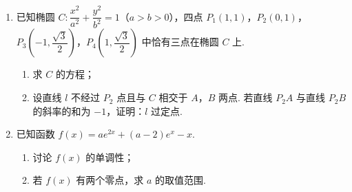 \begin{description}
\begin{enumerate}[leftmargin=5pt]
\begin{enumerate}
\begin{enumerate}
{\renewcommand{\arraystretch}{0.8}
\begin{center}
\begin{tabular}{cccccccc}
\(9.95\) & \(10.12\) & \(9.96\) & \(9.96\) & \(10.01\) & \(9.92\) & \(9.98\) & \(10.04\) \\
\(10.26\) & \(9.91\) & \(10.13\) & \(10.02\) & \(9.22\) & \(10.04\) & \(10.05\) & \(9.95\)
\end{tabular}
\end{center}}

经计算得 \(\bar x=\dfrac1{16}\sum_{i=1}^{16}x_i=9.97\)，
\(s=\sqrt{\dfrac1{16}\sum_{i=1}^{16}(x_i-\bar x)^2}
=\sqrt{\dfrac1{16}\left(\sum_{i=1}^{16}x_i^2-16\bar x^2\right)}\approx0.212\)，
其中 \(x_i\) 为抽取的第 \(i\) 个零件的尺寸，\(i=1\)，\(2\)，\(\dots\)，\(16\).

用样本平均数作为 \(\mu\) 的估计值，用样本标准差 \(s\) 作为 \(\sigma\) 的估计值，利用估计值判断是否需对当天的生产过程进行检查？剔除 \((\hat\mu-3\hat\sigma,\hat\mu+3\hat\sigma)\) 之外的数据，用剩下的数据估计 \(\mu\) 和 \(\sigma\)（精确到 \(0.01\)）.
\end{enumerate}
\end{enumerate}

附：若随机变量 \(Z\) 服从正态分布 \(N(\mu,\sigma^2)\)，则 \(P(\mu-3\sigma<Z<\mu+3\sigma)=0.9974\)，\(0.9974^{16}\approx0.9592\)，\(\sqrt{0.008}\approx0.09\).

        \item 已知椭圆 \(C:\dfrac{x^2}{a^2}+\dfrac{y^2}{b^2}=1\)（\(a>b>0\)），四点 \(P_1(1,1)\)，\(P_2(0,1)\)，\(P_3\left(-1,\dfrac{\sqrt3}{2}\right)\)，\(P_4\left(1,\dfrac{\sqrt3}{2}\right)\) 中恰有三点在椭圆 \(C\) 上.

\begin{enumerate}
\item 求 \(C\) 的方程；
\item 设直线 \(l\) 不经过 \(P_2\) 点且与 \(C\) 相交于 \(A\)，\(B\) 两点. 若直线 \(P_2A\) 与直线 \(P_2B\) 的斜率的和为 \(-1\)，证明：\(l\) 过定点.
\end{enumerate}

        \item 已知函数 \(f(x)=ae^{2x}+(a-2)e^x-x\).

\begin{enumerate}
\item 讨论 \(f(x)\) 的单调性；
\item 若 \(f(x)\) 有两个零点，求 \(a\) 的取值范围.
\end{enumerate}

    \end{enumerate}

\end{description}

